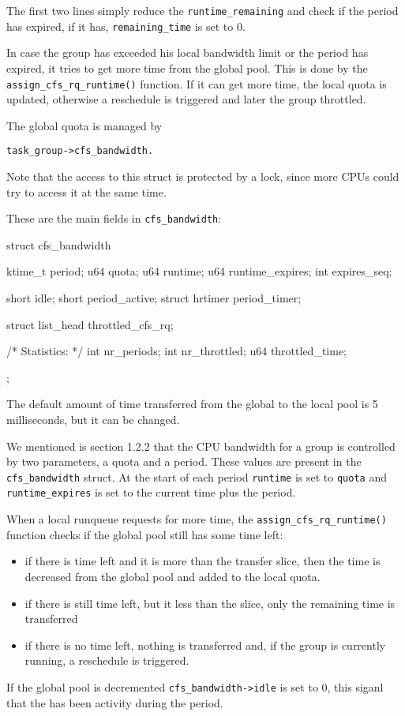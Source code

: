The first two lines simply reduce the \verb|runtime_remaining| and check if the period has expired, if it has, \verb|remaining_time| is set to 0.

In case the group has exceeded his local bandwidth limit or the period has expired, it tries to get more time from the global pool. This is done by the \verb|assign_cfs_rq_runtime()| function. If it can get more time, the local quota is updated, otherwise a reschedule is triggered and later the group throttled.

The global quota is managed by 
\begin{verbatim}
task_group->cfs_bandwidth.
\end{verbatim}
Note that the access to this struct is protected by a lock, since more CPUs could try to access it at the same time.

These are the main fields in \verb|cfs_bandwidth|:
\begin{code}
struct cfs_bandwidth {
	ktime_t			period;
	u64			quota;
	u64			runtime;
	u64			runtime_expires;
	int			expires_seq;
    
    short			idle;
	short			period_active;
	struct hrtimer		period_timer;
	
	struct list_head	throttled_cfs_rq;

	/* Statistics: */
	int			nr_periods;
	int			nr_throttled;
	u64			throttled_time;
};
\end{code}
The default amount of time transferred from the global to the local pool is 5 milliseconds, but it can be changed.

We mentioned is section 1.2.2 that the CPU bandwidth for a group is controlled by two parameters, a quota and a period. These values are present in the \verb|cfs_bandwidth| struct. At the start of each period \verb|runtime| is set to \verb|quota| and \verb|runtime_expires| is set to the current time plus the period.

When a local runqueue requests for more time, the \verb|assign_cfs_rq_runtime()| function checks if the global pool still has some time left:
\begin{itemize}
    \item if there is time left and it is more than the transfer slice, then the time is decreased from the global pool and added to the local quota.
    \item if there is still time left, but it less than the slice, only the remaining time is transferred
    \item if there is no time left, nothing is transferred and, if the group is currently running, a reschedule is triggered.
\end{itemize}
If the global pool is decremented \verb|cfs_bandwidth->idle| is set to 0, this siganl that the has been activity during the period.

